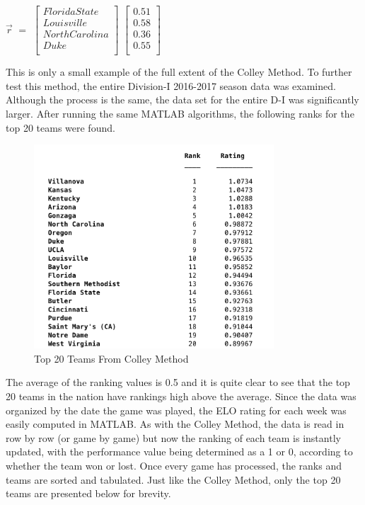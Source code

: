 \documentclass{article}
\begin{document}
\begin{center}
$\vec{r}$ $=$
$\begin{bmatrix}
Florida State\\
Louisville\\
North Carolina\\
Duke\\
\end{bmatrix}$
$\begin{bmatrix}
0.51\\
0.58\\
0.36\\
0.55\\
\end{bmatrix}$
\end{center}
This is only a small example of the full extent of the Colley Method. To further test this method, the entire Division-I 2016-2017 season data was examined. Although the process is the same, the data set for the entire D-I was significantly larger. After running the same MATLAB algorithms, the following ranks for the top 20 teams were found.
\begin{figure}[H]
\centering
\includegraphics[width=0.8\textwidth]{Top20}
\caption{Top 20 Teams From Colley Method}
\label{fig:20Team}
\end{figure}
The average of the ranking values is 0.5 and it is quite clear to see that the top 20 teams in the nation have rankings high above the average.
\bigbreak
Since the data was organized by the date the game was played, the ELO rating for each week was easily computed in MATLAB. As with the Colley Method, the data is read in row by row (or game by game) but now the ranking of each team is instantly updated, with the performance value being determined as a 1 or 0, according to whether the team won or lost. Once every game has processed, the ranks and teams are sorted and tabulated. Just like the Colley Method, only the top 20 teams are presented below for brevity.
\end{document}
